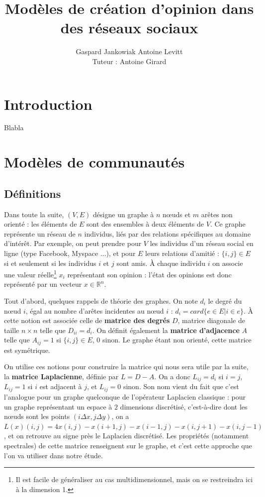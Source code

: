 \documentclass[12pt]{article}
\newcommand{\R}{\mathbb{R}}
\begin{document}
\author{Gaspard Jankowiak \quad Antoine Levitt\\ Tuteur : Antoine Girard}
\title{Modèles de création d'opinion dans des réseaux sociaux}
\maketitle
{}
\tableofcontents
\newpage

\section{Introduction}
Blabla


\section{Modèles de communautés}
\subsection{Définitions}
Dans toute la suite, $(V, E)$ désigne un graphe à $n$ n\oe uds et $m$
arêtes non orienté : les éléments de $E$ sont des ensembles à deux
éléments de $V$. Ce graphe représente un réseau de $n$ individus, liés
par des relations spécifiques au domaine d'intérêt. Par exemple, on
peut prendre pour $V$ les individus d'un réseau social en ligne (type
Facebook, Myspace ...), et pour $E$ leurs relations d'amitié : $\{i,
j\} \in E$ si et seulement si les individus $i$ et $j$ sont amis. À
chaque individu $i$ on associe une valeur réelle\footnote{Il est facile
de généraliser au cas multidimensionnel, mais on se restreindra ici à la
dimension 1.} $x_i$ représentant son opinion : l'état des opinions est
donc représenté par un vecteur $x \in \R^n$.

Tout d'abord, quelques rappels de théorie des graphes. On note $d_i$
le degré du n\oe ud $i$, égal au nombre d'arêtes incidentes au n\oe ud
$i$ : $d_i = card \{e \in E | i \in e\}$. À cette notion est
associée celle de {\bf matrice des degrés} $D$, matrice diagonale
de taille $n \times n$ telle que $D_{i i} = d_i$. On définit
également la {\bf matrice d'adjacence} $A$ telle que $A_{i j} = 1$
si $\{i, j\} \in E$, $0$ sinon. Le graphe étant non orienté, cette
matrice est symétrique.

On utilise ces notions pour construire la matrice qui nous sera
utile par la suite, la {\bf matrice Laplacienne}, définie par $L
= D - A$. On a donc $L_{i j} = d_i$ si $i = j$, $L_{i j} = 1$ si
$i$ est adjacent à $j$, et $L_{i j} = 0$ sinon. Son nom vient du
fait que c'est l'analogue pour un graphe quelconque de
l'opérateur Laplacien classique : pour un graphe représentant un
espace à $2$ dimensions discrétisé, c'est-à-dire dont les n\oe uds
sont les points $(i \Delta x, j \Delta y)$, on a $L(x) (i, j) =
4 x(i, j) - x(i+1, j) - x(i-1, j) - x(i, j+1) - x(i, j-1)$, et
on retrouve au signe près le Laplacien discrétisé. Les
propriétés (notamment spectrales) de cette matrice renseignent
sur le graphe, et c'est cette approche que l'on va utiliser dans
notre étude.
\end{document}
